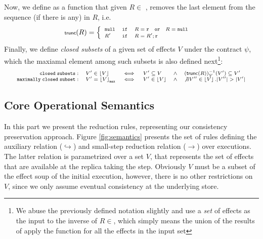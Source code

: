 Now, we define \trunc{} as a function that
given  $R \in$ \relationS{}, removes the last element from the
sequence (if there is any) in $R$, i.e.
\begin{equation}
\scriptsize
\trunc{R} = 
\begin{cases}
\begin{array}{lcl}
\nullR & \myif & R = \rel \quad \mathtt{or} \quad R = \nullR \\
R' & \myif & R = R';\rel 
\end{array}
\end{cases}
\end{equation}
Finally, we define \emph{closed subsets} of a given set of
effects $V$ under the contract $\psi$, which the maxiamal element among such
subsets is also defined next\footnote{We abuse the previously defined notation slightly
and use a \emph{set} of effects as the input to the inverse of
$R\in $\relationS{}, which simply means 
the union of the results of apply the function for all the effects in
the input set}:
\begin{equation}
\scriptsize
\begin{array}{rlllll}
\mathtt{closed \; subsets:} &  V' \in \left \lfloor  V \right \rfloor & \iff & V' \subseteq V & \wedge &
(\trunc R)_V^{-1}(V') \subseteq V'   \\
\mathtt{maximally \; closed \; subset:} & V' = \left \lfloor  V \right
\rfloor_{\mathtt{max}} & \iff & V' \in \left \lfloor  V \right \rfloor &
\wedge & \not\exists V'' \in \left \lfloor  V \right \rfloor. |V''|>|V'|
\end{array}
\end{equation}


\subsection{Core Operational Semantics}

In this part we present the reduction rules, representing our
consistency preservation approach.
Figure \ref{fig:semantics} presents the set of rules defining the
auxiliary relation ($\hookrightarrow$) and small-step reduction relation 
($\rightarrow$) over executions. The latter relation is parametrized
over a set $V$,
that represents the set of effects that are available at the replica 
taking the step. Obviously $V$ must be a subset of the effect soup 
of the initial execution, however, there is no other restrictions on $V$,
since we only assume eventual consistency at the underlying store.


